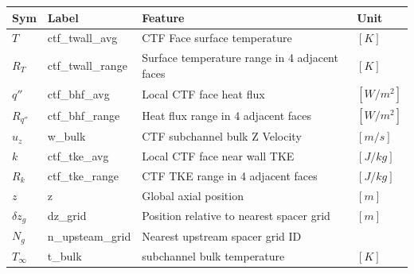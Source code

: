 \documentclass[t, pdftex]{beamer}
\begin{document}
\begin{frame}[shrink=20]
\begin{table}[h]
\begin{center}
        \begin{tabular}[h]{|l | l | l | l |}
            \hline
            Sym & Label & Feature & Unit \\
            \hline
            \hline
            $T$ & ctf\_twall\_avg & CTF Face surface temperature & $[K]$ \\
            $R_T$ & ctf\_twall\_range & Surface temperature range in 4 adjacent faces & $[K]$ \\
            $q''$ & ctf\_bhf\_avg & Local CTF face heat flux & $[W/m^2]$ \\
            $R_{q''}$ & ctf\_bhf\_range & Heat flux range in 4 adjacent faces & $[W/m^2]$ \\
            $u_z$ & w\_bulk & CTF subchannel bulk Z Velocity &  $[m/s]$ \\
            $k$ & ctf\_tke\_avg & Local CTF face near wall TKE &  $[J/kg]$ \\
            $R_k$ & ctf\_tke\_range & CTF TKE range in 4 adjacent faces & $[J/kg]$ \\
            $z$ & z & Global axial position & $[m]$ \\
            $\delta z_g$ & dz\_grid & Position relative to nearest spacer grid & $[m]$ \\
            $N_g$ & n\_upsteam\_grid  & Nearest upstream spacer grid ID &  \\
            $T_\infty$ & t\_bulk & subchannel bulk temperature  &  $[K]$ \\
            \hline
        \end{tabular}
        \label{tab:features}
    \end{center}
\end{table}
\end{frame}
\end{document}
